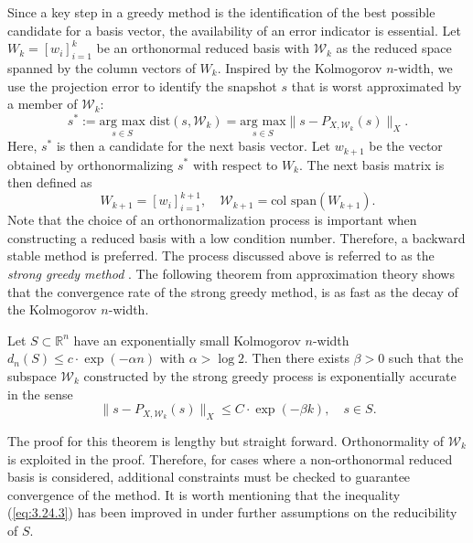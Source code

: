 Since a key step in a greedy method is the identification of the best possible candidate for a basis vector, the availability of an error indicator is essential. Let $W_k = [ w_i ]_{i=1}^k$ be an orthonormal reduced basis with $\mathcal W_k$ as the reduced space spanned by the column vectors of $W_k$. Inspired by the Kolmogorov $n$-width, we use the projection error to identify the snapshot $s$ that is worst approximated by a member of $\mathcal W_k$:
\begin{equation} \label{eq:3.24.1}
	s^* := \underset{s\in S}{\text{arg\ max} } \text{\ dist}(s,\mathcal W_k)
= \underset{s\in S}{\text{arg\ max} } \| s - P_{X,\mathcal W_k}(s) \|_X. \end{equation}
Here, $s^*$ is then a candidate for the next basis vector. Let $w_{k+1}$ be the vector obtained by orthonormalizing $s^*$ with respect to $W_k$. The next basis matrix is then defined as
\begin{equation} \label{eq:3.24.2}
	W_{k+1} = [w_i]_{i=1}^{k+1}, \quad \mathcal W_{k+1} = \text{col\ span}(W_{k+1}). 
\end{equation}
Note that the choice of an orthonormalization process is important when constructing a reduced basis with a low condition number. Therefore, a backward stable method is preferred. The process discussed above is referred to as the \emph{strong greedy method} \cite{quarteroni2015reduced}. The following theorem from approximation theory shows that the convergence rate of the strong greedy method, is as fast as the decay of the Kolmogorov $n$-width. 
\begin{theorem}
	\cite{doi:10.1137/100795772} Let $S\subset \mathbb R^{n}$ have an exponentially small Kolmogorov $n$-width $d_n(S) \leq c\cdot \exp(-\alpha n)$ with $\alpha > \log 2$. Then there exists $\beta > 0$ such that the subspace $\mathcal W_k$ constructed by the strong greedy process is exponentially accurate in the sense
\begin{equation} \label{eq:3.24.3}
	\| s - P_{X,\mathcal W_k}(s) \|_X \leq C\cdot \exp(-\beta k), \quad s \in S.
\end{equation}
\end{theorem}
The proof for this theorem is lengthy but straight forward. Orthonormality of $\mathcal W_k$ is exploited in the proof. Therefore, for cases where a non-orthonormal reduced basis is considered, additional constraints must be checked to guarantee convergence of the method. It is worth mentioning that the inequality (\ref{eq:3.24.3}) has been improved in \cite{buffa2012priori} under further assumptions on the reducibility of $S$. 

